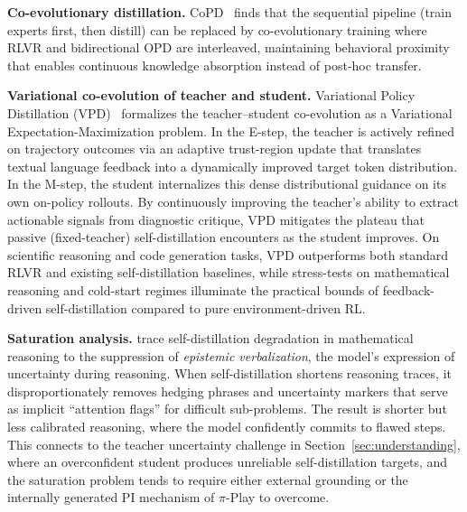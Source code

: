 \documentclass{article} %
\begin{document}
\textbf{Co-evolutionary distillation.} CoPD~\citep{2604.27083} finds that the sequential pipeline (train experts first, then distill) can be replaced by co-evolutionary training where RLVR and bidirectional OPD are interleaved, maintaining behavioral proximity that enables continuous knowledge absorption instead of post-hoc transfer.

\textbf{Variational co-evolution of teacher and student.} Variational Policy Distillation (VPD)~\citep{2605.15113} formalizes the teacher--student co-evolution as a Variational Expectation-Maximization problem. In the E-step, the teacher is actively refined on trajectory outcomes via an adaptive trust-region update that translates textual language feedback into a dynamically improved target token distribution. In the M-step, the student internalizes this dense distributional guidance on its own on-policy rollouts. By continuously improving the teacher's ability to extract actionable signals from diagnostic critique, VPD mitigates the plateau that passive (fixed-teacher) self-distillation encounters as the student improves. On scientific reasoning and code generation tasks, VPD outperforms both standard RLVR and existing self-distillation baselines, while stress-tests on mathematical reasoning and cold-start regimes illuminate the practical bounds of feedback-driven self-distillation compared to pure environment-driven RL.

\textbf{Saturation analysis.} \citet{2603.24472} trace self-distillation degradation in mathematical reasoning to the suppression of \emph{epistemic verbalization}, the model's expression of uncertainty during reasoning. When self-distillation shortens reasoning traces, it disproportionately removes hedging phrases and uncertainty markers that serve as implicit ``attention flags'' for difficult sub-problems. The result is shorter but less calibrated reasoning, where the model confidently commits to flawed steps. This connects to the teacher uncertainty challenge in Section~\ref{sec:understanding}, where an overconfident student produces unreliable self-distillation targets, and the saturation problem tends to require either external grounding or the internally generated PI mechanism of $\pi$-Play to overcome.
\end{document}

